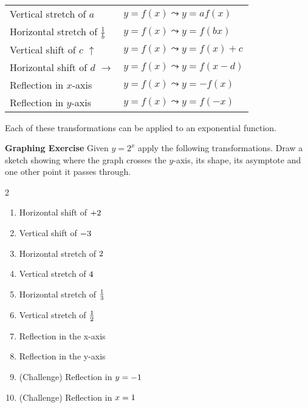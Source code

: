 \begin{center}
\begin{tabular}{ll}Vertical stretch of $a$  & $y =f (x) \leadsto y =a f (x)$  \\
	Horizontal stretch of $\frac{1}{b}$  & $y =f (x) \leadsto y =f (b x)$  \\
	Vertical shift of $c$ $\uparrow $  & $y =f (x) \leadsto y =f (x) +c$  \\
	Horizontal shift of $d$ $ \longrightarrow $  & $y =f (x) \leadsto y =f (x -d)$  \\
	Reflection in $x$-axis  & $y =f (x) \leadsto y = -f (x)$  \\
	Reflection in $y$-axis  & $y =f (x) \leadsto y =f ( -x)$
\end{tabular}
\end{center}
Each of these transformations can be applied to an exponential
function. 

\textbf{Graphing Exercise} Given $y =2^{x}$ apply the following transformations. Draw a sketch showing where the graph crosses the $y$-axis, its shape, its asymptote and one other point it passes through. 

\columnseprule =0.4pt
\begin {multicols}{2}
\begin{enumerate}
	\item Horizontal shift of $ +2\vspace{+2.000000cm}$ 
	
	\item Vertical shift of $ -3\vspace{+2.000000cm}$ 
	
	\item Horizontal stretch of $2\vspace{+2.000000cm}$ 
	
	\item Vertical stretch of $4\vspace{+2.000000cm}$ 
	
	\item Horizontal stretch of $\frac{1}{3}\vspace{+2.000000cm}$ 
	
	\item Vertical stretch of $\frac{1}{2}\vspace{+2.000000cm}$ 
	
	\item Reflection in the x-axis\vspace{2cm}
	
	
	\item Reflection in the y-axis\vspace{2cm} 
	
	\item (Challenge) Reflection in $y = -1\vspace{+2.000000cm}$ 
	
	\item (Challenge) Reflection in $x =1\vspace{+4.000000cm}$ \end{enumerate}

\end {multicols}
\medskip\medskip\medskip\medskip

